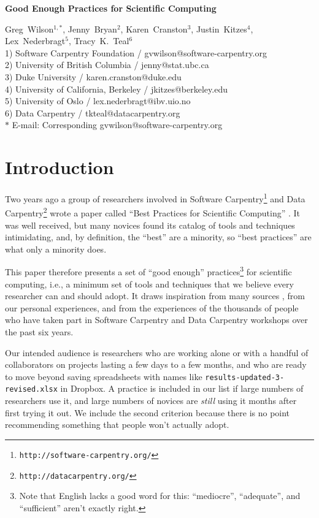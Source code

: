 \documentclass[10pt]{article}
\date{}
\newcommand{\withurl}[2]{{#1}\footnote{\texttt{#2}}}
\begin{document}
\begin{flushleft}
{\Large
\textbf{Good Enough Practices for Scientific Computing}
}

{Greg~Wilson}$^{1,\ast}$,
{Jenny~Bryan}$^{2}$,
{Karen~Cranston}$^{3}$,
{Justin~Kitzes}$^{4}$,
{Lex~Nederbragt}$^{5}$,
{Tracy~K.~Teal}$^{6}$
\\
1) Software Carpentry Foundation / gvwilson@software-carpentry.org
\\
2) University of British Columbia / jenny@stat.ubc.ca
\\
3) Duke University / karen.cranston@duke.edu
\\
4) University of California, Berkeley / jkitzes@berkeley.edu
\\
5) University of Oslo / lex.nederbragt@ibv.uio.no
\\
6) Data Carpentry / tkteal@datacarpentry.org
\\
$\ast$ E-mail: Corresponding gvwilson@software-carpentry.org
\end{flushleft}

\section{Introduction}\label{sec:introduction}

Two years ago a group of researchers involved in \withurl{Software
Carpentry}{http://software-carpentry.org/} and \withurl{Data
Carpentry}{http://datacarpentry.org/} wrote a paper called
``Best Practices for Scientific Computing'' \cite{wilson2014}.
It was well received, but many novices found its
catalog of tools and techniques intimidating, and, by definition, the
``best'' are a minority, so ``best practices'' are what only a
minority does.

This paper therefore presents a set of ``good enough''
practices\footnote{Note that English lacks a good word for this:
  ``mediocre'', ``adequate'', and ``sufficient'' aren't exactly
  right.} for scientific computing, i.e., a minimum set of tools and
techniques that we believe every researcher can and should adopt. It
draws inspiration from many sources
\cite{gentzkow2014,noble2009,brown2015,wickham2014,kitzes2016,sandve2013,hart2015},
from our personal experiences, and from the experiences of the
thousands of people who have taken part in Software Carpentry and
Data Carpentry workshops over the past six years.

Our intended audience is researchers who are working alone or with a
handful of collaborators on projects lasting a few days to a few
months, and who are ready to move beyond saving spreadsheets with
names like \texttt{results-updated-3-revised.xlsx} in Dropbox. A
practice is included in our list if large numbers of researchers use
it, and large numbers of novices are \emph{still} using it months
after first trying it out. We include the second criterion because
there is no point recommending something that people won't actually
adopt.
\end{document}
